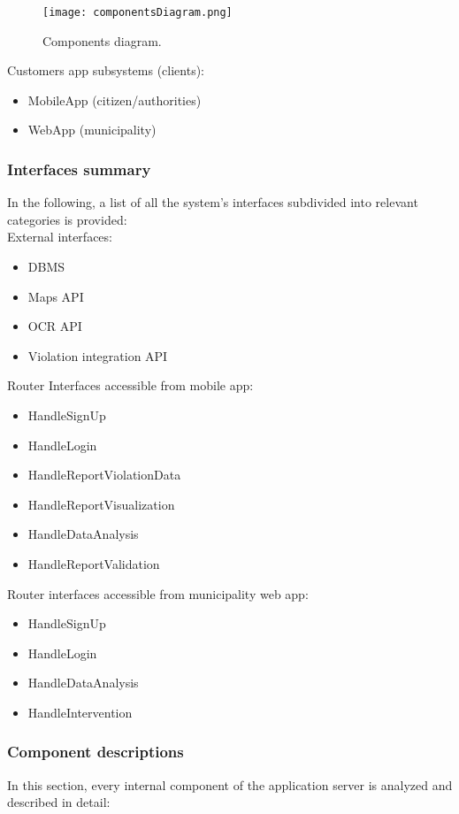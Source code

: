 \begin{figure}[H]
	\centering
	\texttt{[image: componentsDiagram.png]}
	\caption{Components diagram.}
\end{figure}

Customers app subsystems (clients):
\begin{itemize}
	\item MobileApp (citizen/authorities)
	\item WebApp (municipality)
\end{itemize}

\subsubsection{Interfaces summary}
In the following, a list of all the system's interfaces subdivided into relevant categories is provided:\\

External interfaces:
\begin{itemize}
	\item DBMS
	\item Maps API
	\item OCR API
	\item Violation integration API
\end{itemize}

\bigskip
Router Interfaces accessible from mobile app:
\begin{itemize}
	\item HandleSignUp
	\item HandleLogin
	\item HandleReportViolationData
	\item HandleReportVisualization
	\item HandleDataAnalysis
	\item HandleReportValidation
\end{itemize}

\bigskip
Router interfaces accessible from municipality web app:
\begin{itemize}
	\item HandleSignUp
	\item HandleLogin
	\item HandleDataAnalysis
	\item HandleIntervention
\end{itemize}

\bigskip
\subsubsection{Component descriptions}
In this section, every internal component of the application server is analyzed and described in detail:

